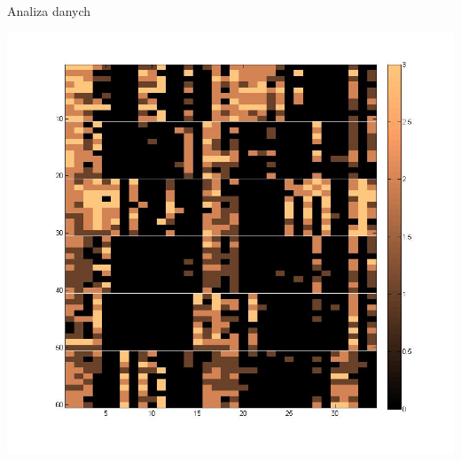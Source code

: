 \documentclass{beamer}
\begin{document}
\begin{frame}{Analiza danych}

\begin{center}
  \includegraphics[scale=0.3]{img/data_imagesc.jpg}  
\end{center}


\end{frame}

%
%
\end{document}

